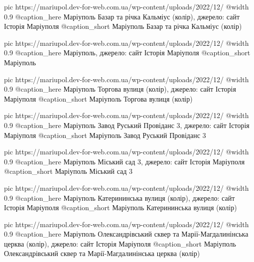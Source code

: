   pic https://mariupol.dev-for-web.com.ua/wp-content/uploads/2022/12/%
  @width 0.9
  @caption_here Маріуполь Базар та річка Кальміус (колір), джерело: сайт Історія Маріуполя
  @caption_short Маріуполь Базар та річка Кальміус (колір)

  pic https://mariupol.dev-for-web.com.ua/wp-content/uploads/2022/12/%
  @width 0.9
  @caption_here Маріуполь, джерело: сайт Історія Маріуполя
  @caption_short Маріуполь

  pic https://mariupol.dev-for-web.com.ua/wp-content/uploads/2022/12/%
  @width 0.9
  @caption_here Маріуполь Торгова вулиця (колір), джерело: сайт Історія Маріуполя
  @caption_short Маріуполь Торгова вулиця (колір)

  pic https://mariupol.dev-for-web.com.ua/wp-content/uploads/2022/12/%
  @width 0.9
  @caption_here Маріуполь Завод Руський Провіданс 3, джерело: сайт Історія Маріуполя
  @caption_short Маріуполь Завод Руський Провіданс 3

  pic https://mariupol.dev-for-web.com.ua/wp-content/uploads/2022/12/%
  @width 0.9
  @caption_here Маріуполь Міський сад 3, джерело: сайт Історія Маріуполя
  @caption_short Маріуполь Міський сад 3

  pic https://mariupol.dev-for-web.com.ua/wp-content/uploads/2022/12/%
  @width 0.9
  @caption_here Маріуполь Катерининська вулиця (колір), джерело: сайт Історія Маріуполя
  @caption_short Маріуполь Катерининська вулиця (колір)

  pic https://mariupol.dev-for-web.com.ua/wp-content/uploads/2022/12/%
  @width 0.9
  @caption_here Маріуполь Олександрівський сквер та Марії-Магдалинінська церква (колір), джерело: сайт Історія Маріуполя
  @caption_short Маріуполь Олександрівський сквер та Марії-Магдалинінська церква (колір)

